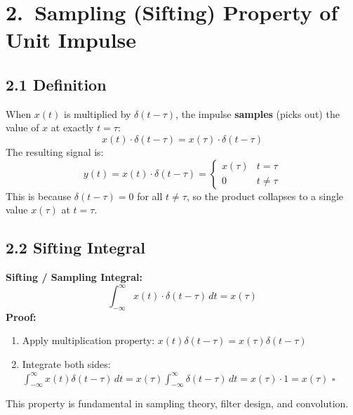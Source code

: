 \documentclass[10pt,a4paper]{article}
\begin{document}
\section{2.\ Sampling (Sifting) Property of Unit Impulse}

\subsection*{2.1 Definition}

\begin{defbox}
When $x(t)$ is multiplied by $\delta(t-\tau)$, the impulse \textbf{samples} (picks out) the value of $x$ at exactly $t=\tau$:
\[
x(t)\cdot\delta(t-\tau) = x(\tau)\cdot\delta(t-\tau)
\]
The resulting signal is:
\[
y(t) = x(t)\cdot\delta(t-\tau) = \begin{cases}x(\tau) & t=\tau\\ 0 & t\neq\tau\end{cases}
\]
This is because $\delta(t-\tau)=0$ for all $t\neq\tau$, so the product collapses to a single value $x(\tau)$ at $t=\tau$.
\end{defbox}

\subsection*{2.2 Sifting Integral}

\begin{propbox}
\textbf{Sifting / Sampling Integral:}
\[
\int_{-\infty}^{\infty} x(t)\cdot\delta(t-\tau)\,dt = x(\tau)
\]
\textbf{Proof:}
\begin{enumerate}[noitemsep, topsep=2pt]
  \item Apply multiplication property: $x(t)\delta(t-\tau) = x(\tau)\delta(t-\tau)$
  \item Integrate both sides: $\displaystyle\int_{-\infty}^{\infty}x(t)\delta(t-\tau)\,dt = x(\tau)\displaystyle\int_{-\infty}^{\infty}\delta(t-\tau)\,dt = x(\tau)\cdot 1 = x(\tau)$ \hfill$\square$
\end{enumerate}
This property is fundamental in sampling theory, filter design, and convolution.
\end{propbox}
\end{document}
